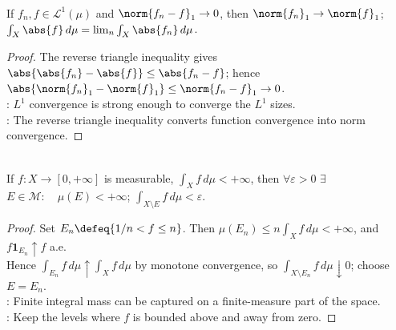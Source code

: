 \begin{proposition} \label{prop:l1-convergence-controls-absolute-integrals} \\
If $f_n,f\in\mathscr{L}^1(\mu)$ and $\norm{f_n-f}_1\to0$, then $\norm{f_n}_1\to\norm{f}_1$; $\int_X\abs{f}\,d\mu=\lim_n\int_X\abs{f_n}\,d\mu$.
\begin{proof}
The reverse triangle inequality gives $\abs{\abs{f_n}-\abs{f}}\leq\abs{f_n-f}$; hence $\abs{\norm{f_n}_1-\norm{f}_1}\leq\norm{f_n-f}_1\to0$.\\
: $L^1$ convergence is strong enough to converge the $L^1$ sizes.\\
: The reverse triangle inequality converts function convergence into norm convergence.
\end{proof}
\end{proposition}

\begin{proposition} \label{prop:finite-positive-integral-localization} \\
If $f:X\to[0,+\infty]$ is measurable, $\int_X f\,d\mu<+\infty$, then $\forall\varepsilon>0$ $\exists$ $E\in\mathcal{M}:\quad \mu(E)<+\infty$; $\int_{X\setminus E} f\,d\mu<\varepsilon$.
\begin{proof}
Set $E_n\defeq\{1/n<f\leq n\}$. Then $\mu(E_n)\leq n\int_X f\,d\mu<+\infty$, and $f\mathbf{1}_{E_n}\uparrow f$ a.e.\\
Hence $\int_{E_n}f\,d\mu\uparrow\int_X f\,d\mu$ by monotone convergence, so $\int_{X\setminus E_n}f\,d\mu\downarrow0$; choose $E=E_n$.\\
: Finite integral mass can be captured on a finite-measure part of the space.\\
: Keep the levels where $f$ is bounded above and away from zero.
\end{proof}
\end{proposition}

